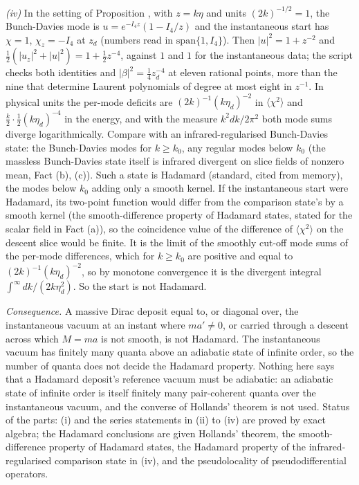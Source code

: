 \emph{(iv)} In the setting of Proposition , with $z = k\eta$ and units $(2k)^{-1/2} = 1$, the Bunch-Davies mode is $u = e^{-I_{4}z}(1 - I_{4}/z)$ and the instantaneous start has $\chi = 1$, $\chi_{z} = -I_{4}$ at $z_{d}$ (numbers read in $\mathrm{span}\{1, I_{4}\}$). Then $|u|^{2} = 1 + z^{-2}$ and $\tfrac12(|u_{z}|^{2} + |u|^{2}) = 1 + \tfrac12z^{-4}$, against $1$ and $1$ for the instantaneous data; the script checks both identities and $|\beta|^{2} = \tfrac14z_{d}^{-4}$ at eleven rational points, more than the nine that determine Laurent polynomials of degree at most eight in $z^{-1}$. In physical units the per-mode deficits are $(2k)^{-1}(k\eta_{d})^{-2}$ in $\langle\chi^{2}\rangle$ and $\tfrac k2\cdot\tfrac12(k\eta_{d})^{-4}$ in the energy, and with the measure $k^{2}dk/2\pi^{2}$ both mode sums diverge logarithmically. Compare with an infrared-regularised Bunch-Davies state: the Bunch-Davies modes for $k \ge k_{0}$, any regular modes below $k_{0}$ (the massless Bunch-Davies state itself is infrared divergent on slice fields of nonzero mean, Fact (b), (c)). Such a state is Hadamard (standard, cited from memory), the modes below $k_{0}$ adding only a smooth kernel. If the instantaneous start were Hadamard, its two-point function would differ from the comparison state's by a smooth kernel (the smooth-difference property of Hadamard states, stated for the scalar field in Fact (a)), so the coincidence value of the difference of $\langle\chi^{2}\rangle$ on the descent slice would be finite. It is the limit of the smoothly cut-off mode sums of the per-mode differences, which for $k \ge k_{0}$ are positive and equal to $(2k)^{-1}(k\eta_{d})^{-2}$, so by monotone convergence it is the divergent integral $\int^{\infty}dk/(2k\eta_{d}^{2})$. So the start is not Hadamard.

\emph{Consequence.} A massive Dirac deposit equal to, or diagonal over, the instantaneous vacuum at an instant where $ma' \neq 0$, or carried through a descent across which $M = ma$ is not smooth, is not Hadamard. The instantaneous vacuum has finitely many quanta above an adiabatic state of infinite order, so the number of quanta does not decide the Hadamard property. Nothing here says that a Hadamard deposit's reference vacuum must be adiabatic: an adiabatic state of infinite order is itself finitely many pair-coherent quanta over the instantaneous vacuum, and the converse of Hollands' theorem is not used. Status of the parts: (i) and the series statements in (ii) to (iv) are proved by exact algebra; the Hadamard conclusions are given Hollands' theorem, the smooth-difference property of Hadamard states, the Hadamard property of the infrared-regularised comparison state in (iv), and the pseudolocality of pseudodifferential operators.

